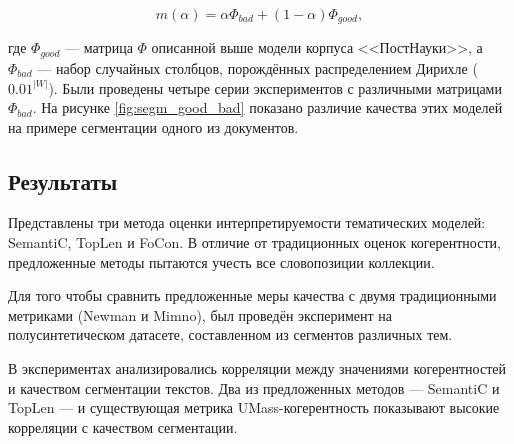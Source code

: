 \[
m(\alpha) = \alpha \Phi_{bad} + (1-\alpha)\Phi_{good},
\]

где $\Phi_{good}$ --- матрица $\Phi$ описанной выше модели корпуса <<ПостНауки>>, а $\Phi_{bad}$ --- набор случайных столбцов, порождённых распределением Дирихле ($0.01^{|W|}$). Были проведены четыре серии экспериментов с различными матрицами $\Phi_{bad}$. На рисунке \ref{fig:segm_good_bad} показано различие качества этих моделей на примере сегментации одного из документов.

\subsection{Результаты}
Представлены три метода оценки интерпретируемости тематических моделей: SemantiC, TopLen и FoCon. В отличие от традиционных оценок когерентности, предложенные методы пытаются учесть все словопозиции коллекции.

Для того чтобы сравнить предложенные меры качества с двумя традиционными метриками (Newman и Mimno), был проведён эксперимент на полусинтетическом датасете, составленном из сегментов различных тем.

В экспериментах анализировались корреляции между значениями когерентностей и качеством сегментации текстов. Два из предложенных методов --- SemantiC и TopLen --- и существующая метрика UMass-когерентность показывают высокие корреляции с качеством сегментации.

